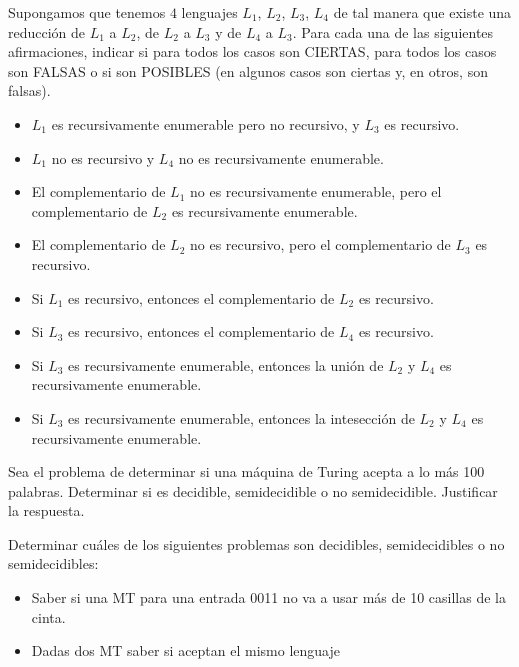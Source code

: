 \begin{ejercicio}
    Supongamos que tenemos $4$ lenguajes $L_1$, $L_2$, $L_3$, $L_4$ de tal manera que existe una reducción de $L_1$ a $L_2$, de $L_2$ a $L_3$ y de $L_4$ a $L_3$. Para cada una de las siguientes afirmaciones,
    indicar si para todos los casos son CIERTAS, para todos los casos son FALSAS o si son POSIBLES (en algunos casos son ciertas y, en otros, son falsas).
    \begin{itemize}
        \item[a)] $L_1$ es recursivamente enumerable pero no recursivo, y $L_3$ es recursivo. 
        \item[b)] $L_1$ no es recursivo y $L_4$ no es recursivamente enumerable.
        \item[c)] El complementario de $L_1$ no es recursivamente enumerable, pero el complementario de $L_2$ es recursivamente enumerable.
        \item[d)] El complementario de $L_2$ no es recursivo, pero el complementario de $L_3$ es recursivo.
        \item[e)] Si $L_1$ es recursivo, entonces el complementario de $L_2$ es recursivo.
        \item[f)] Si $L_3$ es recursivo, entonces el complementario de $L_4$ es recursivo.
        \item[g)] Si $L_3$ es recursivamente enumerable, entonces la unión de $L_2$ y $L_4$ es recursivamente enumerable.
        \item[h)] Si $L_3$ es recursivamente enumerable, entonces la intesección de $L_2$ y $L_4$ es recursivamente enumerable.
    \end{itemize}
\end{ejercicio}


\begin{ejercicio}
    Sea el problema de determinar si una máquina de Turing acepta a lo más 100 palabras. Determinar si es decidible, semidecidible o no semidecidible. Justificar la respuesta.
\end{ejercicio}


\begin{ejercicio}
    Determinar cuáles de los siguientes problemas son decidibles, semidecidibles o no semidecidibles:
    \begin{itemize}
        \item[a)] Saber si una MT para una entrada 0011 no va a usar más de 10 casillas de la cinta.
        \item[b)] Dadas dos MT saber si aceptan el mismo lenguaje
    \end{itemize}
\end{ejercicio}

